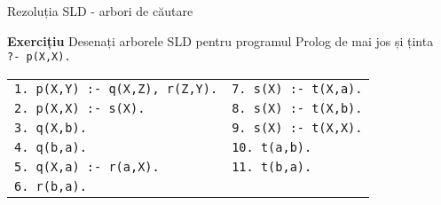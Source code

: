 \documentclass[xcolor=pdftex,romanian,colorlinks]{beamer}
\begin{document}

\begin{frame}{Rezoluția SLD - arbori de căutare}

\textbf{\color{True} Exercițiu}
Desenați arborele SLD pentru programul Prolog de mai jos și ținta \\\texttt{?- p(X,X).}

\medskip

\begin{tabular}{ll}
	\texttt{1. p(X,Y) :- q(X,Z), r(Z,Y).} & \hspace{.5cm} \texttt{7. s(X) :- t(X,a).}  \\
	\texttt{2. p(X,X) :- s(X).}		  & \hspace{.5cm} \texttt{8. s(X) :- t(X,b).}  \\
	\texttt{3. q(X,b).}  			  & \hspace{.5cm} \texttt{9. s(X) :- t(X,X).}  \\
	\texttt{4. q(b,a).} 			  & \hspace{.5cm} \texttt{10. t(a,b).}  \\
	\texttt{5. q(X,a) :- r(a,X).} 		  & \hspace{.5cm} \texttt{11. t(b,a).}  \\
	\texttt{6. r(b,a).} 			  &
\end{tabular}

\end{frame}
\end{document}

